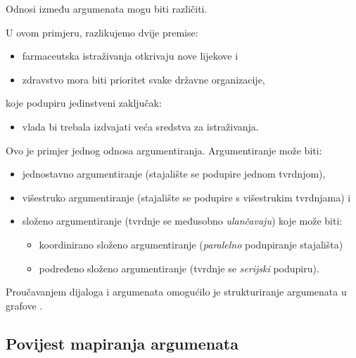 Odnosi između argumenata mogu biti različiti. 

\vspace{1 mm}


U ovom primjeru, razlikujemo dvije premise:
\begin{itemize}
\item farmaceutska istraživanja otkrivaju nove lijekove i 
\item zdravstvo mora biti prioritet svake državne organizacije,
\end{itemize} 
koje podupiru jedinstveni zaključak: 
\begin{itemize}
\item vlada bi trebala izdvajati veća sredstva za istraživanja.
\end{itemize}

Ovo je primjer jednog odnosa argumentiranja. Argumentiranje može biti:
\begin{itemize}
\label{itemize:naciniarg}
\item jednostavno argumentiranje (stajalište se podupire jednom tvrdnjom), 
\item višestruko argumentiranje (stajalište se podupire s višestrukim tvrdnjama) i
\item složeno argumentiranje (tvrdnje se međusobno \emph{ulančavaju}) koje može biti:
	\begin{itemize}
	\item koordinirano složeno argumentiranje (\emph{paralelno} podupiranje stajališta)
	\item podređeno složeno argumentiranje (tvrdnje se \emph{serijski} podupiru). 
	\end{itemize}
\end{itemize}

Proučavanjem dijaloga i argumenata omogućilo je strukturiranje argumenata u
grafove \citep{wolf2006coherence}. 


\subsection{Povijest mapiranja argumenata}

